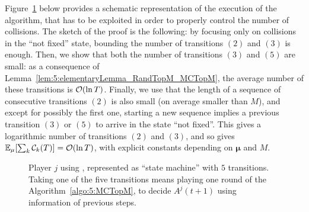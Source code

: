 %
Figure~\ref{fig:5:StateMachineAlgorithm_MCTopM} below provides a schematic representation of the execution of the \MCTopM{} algorithm, that has to be exploited in order to properly control the number of collisions.
%
The sketch of the proof is the following: by focusing only on collisions in the ``not fixed'' state, bounding the number of transitions $(2)$ and $(3)$ is enough.
Then, we show that both the number of transitions $(3)$ and $(5)$ are small: as a consequence of Lemma~\ref{lem:5:elementaryLemma_RandTopM_MCTopM}, the average number of these transitions is $\mathop{}\mathopen{}\mathcal{O}\mathopen{}\left(\ln T\right)$.
Finally, we use that the length of a sequence of consecutive transitions $(2)$ is also small (on average smaller than $M$), and except for possibly the first one, starting a new sequence implies a previous transition $(3)$ or $(5)$ to arrive in the state ``not fixed''. This gives a logarithmic number of transitions $(2)$ and $(3)$, and so gives $\mathbb{E}_{\mu}[\sum_k\mathcal{C}_k(T)] = \mathop{}\mathopen{}\mathcal{O}\mathopen{}\left(\ln T\right)$,
with explicit constants depending on $\boldsymbol{\mu}$ and $M$.

\begin{figure}[h!]
  \caption[``State-machine'' representation of \MCTopM]{Player $j$ using \MCTopM, represented as ``state machine'' with $5$ transitions.
  Taking one of the five transitions means playing one round of the Algorithm~\ref{algo:5:MCTopM}, to decide $A^j(t+1)$ using information of previous steps.}
  \label{fig:5:StateMachineAlgorithm_MCTopM}
\end{figure}

